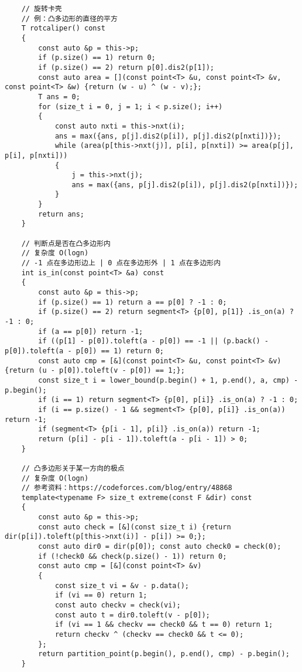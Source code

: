 \documentclass[a4paper,10pt]{article}
\begin{document}
\begin{lstlisting}
    // 旋转卡壳
    // 例：凸多边形的直径的平方
    T rotcaliper() const
    {
        const auto &p = this->p;
        if (p.size() == 1) return 0;
        if (p.size() == 2) return p[0].dis2(p[1]);
        const auto area = [](const point<T> &u, const point<T> &v, const point<T> &w) {return (w - u) ^ (w - v);};
        T ans = 0;
        for (size_t i = 0, j = 1; i < p.size(); i++)
        {
            const auto nxti = this->nxt(i);
            ans = max({ans, p[j].dis2(p[i]), p[j].dis2(p[nxti])});
            while (area(p[this->nxt(j)], p[i], p[nxti]) >= area(p[j], p[i], p[nxti]))
            {
                j = this->nxt(j);
                ans = max({ans, p[j].dis2(p[i]), p[j].dis2(p[nxti])});
            }
        }
        return ans;
    }

    // 判断点是否在凸多边形内
    // 复杂度 O(logn)
    // -1 点在多边形边上 | 0 点在多边形外 | 1 点在多边形内
    int is_in(const point<T> &a) const
    {
        const auto &p = this->p;
        if (p.size() == 1) return a == p[0] ? -1 : 0;
        if (p.size() == 2) return segment<T> {p[0], p[1]} .is_on(a) ? -1 : 0;
        if (a == p[0]) return -1;
        if ((p[1] - p[0]).toleft(a - p[0]) == -1 || (p.back() - p[0]).toleft(a - p[0]) == 1) return 0;
        const auto cmp = [&](const point<T> &u, const point<T> &v) {return (u - p[0]).toleft(v - p[0]) == 1;};
        const size_t i = lower_bound(p.begin() + 1, p.end(), a, cmp) - p.begin();
        if (i == 1) return segment<T> {p[0], p[i]} .is_on(a) ? -1 : 0;
        if (i == p.size() - 1 && segment<T> {p[0], p[i]} .is_on(a)) return -1;
        if (segment<T> {p[i - 1], p[i]} .is_on(a)) return -1;
        return (p[i] - p[i - 1]).toleft(a - p[i - 1]) > 0;
    }

    // 凸多边形关于某一方向的极点
    // 复杂度 O(logn)
    // 参考资料：https://codeforces.com/blog/entry/48868
    template<typename F> size_t extreme(const F &dir) const
    {
        const auto &p = this->p;
        const auto check = [&](const size_t i) {return dir(p[i]).toleft(p[this->nxt(i)] - p[i]) >= 0;};
        const auto dir0 = dir(p[0]); const auto check0 = check(0);
        if (!check0 && check(p.size() - 1)) return 0;
        const auto cmp = [&](const point<T> &v)
        {
            const size_t vi = &v - p.data();
            if (vi == 0) return 1;
            const auto checkv = check(vi);
            const auto t = dir0.toleft(v - p[0]);
            if (vi == 1 && checkv == check0 && t == 0) return 1;
            return checkv ^ (checkv == check0 && t <= 0);
        };
        return partition_point(p.begin(), p.end(), cmp) - p.begin();
    }


\end{lstlisting}
\end{document}
